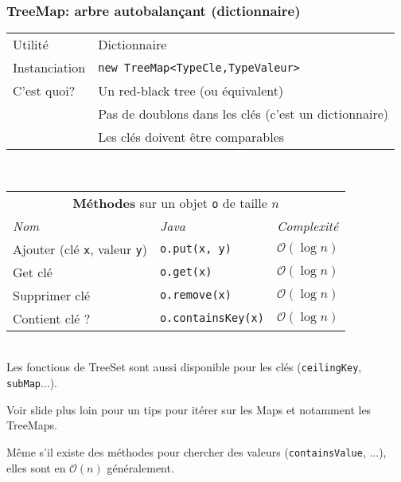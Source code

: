 \documentclass[8pt,aspectratio=169]{beamer}
\begin{document}
\begin{frame}
\frametitle{TreeMap: arbre autobalançant (dictionnaire)}
\centering
\begin{tabular}{ll}
	Utilité & Dictionnaire\\
	Instanciation & \texttt{new TreeMap<TypeCle,TypeValeur>}\\
	C'est quoi? & Un red-black tree (ou équivalent)\\
	& \color{red} Pas de doublons dans les clés (c'est un dictionnaire)\\
	& \color{red} Les clés doivent être comparables
\end{tabular}\\
\vspace{0.5cm}
\centering
\begin{tabular}{lll}
	\multicolumn{3}{c}{\textbf{Méthodes} sur un objet \texttt{o} de taille $n$} \\
	\textit{Nom} & \textit{Java} & \textit{Complexité} \\
	Ajouter (clé \texttt{x}, valeur \texttt{y})& \texttt{o.put(x, y)} & $\mathcal{O}(\log n)$\\
	Get clé & \texttt{o.get(x)} & $\mathcal{O}(\log n)$\\
	Supprimer clé & \texttt{o.remove(x)} & $\mathcal{O}(\log n)$\\
	Contient clé ? & \texttt{o.containsKey(x)} & $\mathcal{O}(\log n)$\\
\end{tabular}\\
\vspace{0.5cm}
\color{blue} Les fonctions de TreeSet sont aussi disponible pour les clés (\texttt{ceilingKey}, \texttt{subMap}...).

\color{blue} Voir slide plus loin pour un tips pour itérer sur les Maps et notamment les TreeMaps.

\color{red} Même s'il existe des méthodes pour chercher des valeurs (\texttt{containsValue}, ...), elles sont en $\mathcal{O}(n)$ généralement.
\end{frame}
\end{document}
